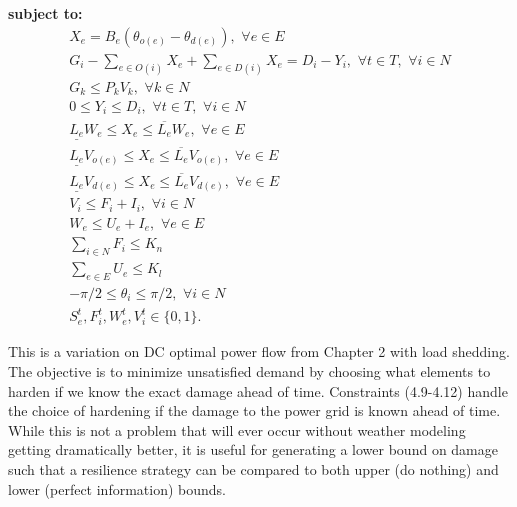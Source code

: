 \textbf{subject to:}
\begin{eqnarray}
X_e = B_e (\theta_{o(e)} - \theta_{d(e)}),  \hspace{4pt} \forall e \in E\\
G_i - \sum_{e \in O(i)} X_e + \sum_{e \in D(i)} X_e = D_i-Y_i, \hspace{4pt} \forall t \in T, \hspace{4pt} \forall i \in N\\
G_k \leq P_{k} V_{k}, \hspace{4pt} \forall k \in N\\
0\leq Y_i \leq D_i, \hspace{4pt} \forall t \in T, \hspace{4pt} \forall i \in N\\
\underline{L_e}W_{e} \leq X_{e} \leq \overline{L_e}W_{e}, \hspace{4pt} \forall e \in E\\
\underline{L_e}V_{o(e)} \leq X_{e} \leq \overline{L_e}V_{o(e)},  \hspace{4pt} \forall e \in E\\
\underline{L_e}V_{d(e)} \leq X_{e} \leq \overline{L_e}V_{d(e)}, \hspace{4pt} \forall e \in E\\
V_i \leq F_i+I_i, \hspace{4pt} \forall i \in N\\
W_{e} \leq  U_{e}+I_e, \hspace{4pt} \forall e \in E\\
\sum_{i \in N} F_i \leq K_n\\
\sum_{e \in E} U_{e} \leq K_l\\
-\pi/2 \leq \theta_i \leq \pi/2, \hspace{4pt} \forall i \in N\\
S_{e}^t,F_{i}^t,W_{e}^t,V_{i}^t \in \{0,1\}. 
\end{eqnarray}

This is a variation on DC optimal power flow from Chapter 2 with load shedding. The objective is to minimize unsatisfied demand by choosing what elements to harden if we know the exact damage ahead of time. Constraints (4.9-4.12) handle the choice of hardening if the damage to the power grid is known ahead of time. While this is not a problem that will ever occur without weather modeling getting dramatically better, it is useful for generating a lower bound on damage such that a resilience strategy can be compared to both upper (do nothing) and lower (perfect information) bounds.

